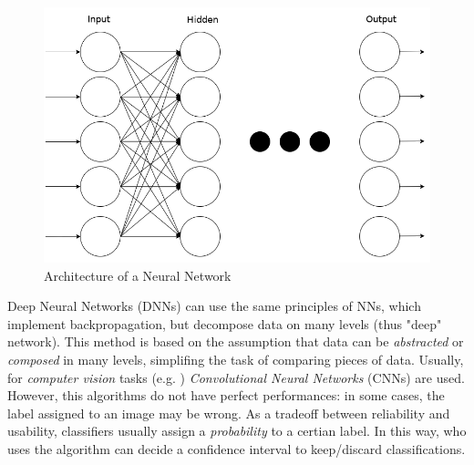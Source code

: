 \begin{figure}[htpb]
\centering
    \includegraphics[scale=0.3]{../img/nn}
    \caption{Architecture of a Neural Network}
    \label{fig:nn}
\end{figure}

Deep Neural Networks (DNNs) can use the same principles of NNs, which implement backpropagation, but decompose data on many levels (thus "deep" network). This method is based on the assumption that data can be \textit{abstracted} or \textit{composed} in many levels, simplifing the task of comparing pieces of data.
Usually, for \textit{computer vision} tasks (e.g. \cite{Handwritten}) \textit{Convolutional Neural Networks} (CNNs) are used\cite{CNN}.
However, this algorithms do not have perfect performances: in some cases, the label assigned to an image may be wrong. As a tradeoff between reliability and usability, classifiers usually assign a \textit{probability} to a certian label. In this way, who uses the algorithm can decide a confidence interval to keep/discard classifications. 